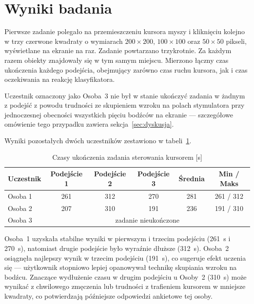 \section{Wyniki badania}
Pierwsze zadanie polegało na przemieszczeniu kursora myszy i kliknięciu
kolejno w trzy czerwone kwadraty o wymiarach $200\times200$, $100\times100$
oraz $50\times50$ pikseli, wyświetlane na ekranie na raz. 
Zadanie powtarzano trzykrotnie. Za każdym razem obiekty znajdowały się w tym samym miejscu. Mierzono łączny czas ukończenia każdego podejścia, obejmujący zarówno czas ruchu kursora,
jak i czas oczekiwania na reakcję klasyfikatora.

Uczestnik oznaczony jako Osoba~3 nie był w stanie ukończyć zadania
w żadnym z podejść z powodu trudności ze skupieniem wzroku
na polach stymulatora przy jednoczesnej obecności wszystkich pięciu bodźców
na ekranie --- szczegółowe omówienie tego przypadku zawiera
sekcja~\ref{sec:dyskusja}.

Wyniki pozostałych dwóch uczestników zestawiono w tabeli~\ref{tab:task1}.

\begin{table}[!ht]
\centering
\caption{Czasy ukończenia zadania sterowania kursorem [s]}
\label{tab:task1}
\begin{tabular}{lccccc}
    \toprule
    \textbf{Uczestnik} & \textbf{Podejście 1} & \textbf{Podejście 2}
        & \textbf{Podejście 3} & \textbf{Średnia} & \textbf{Min / Maks} \\
    \midrule
    Osoba 1 & 261 & 312 & 270 & 281 & 261 / 312 \\
    Osoba 2 & 207 & 310 & 191 & 236 & 191 / 310 \\
    Osoba 3 & \multicolumn{5}{c}{zadanie nieukończone} \\
    \bottomrule
\end{tabular}
\end{table}

Osoba~1 uzyskała stabilne wyniki w pierwszym i trzecim podejściu
(261~s i 270~s), natomiast drugie podejście było wyraźnie dłuższe
(312~s). Osoba~2 osiągnęła najlepszy wynik w trzecim podejściu (191~s),
co sugeruje efekt uczenia się --- użytkownik stopniowo lepiej opanowywał
technikę skupiania wzroku na bodźcu. Znaczące wydłużenie czasu
w drugim podejściu u Osoby~2 (310~s) może wynikać z chwilowego
zmęczenia lub trudności z trafieniem kursorem w mniejsze kwadraty,
co potwierdzają późniejsze odpowiedzi ankietowe tej osoby.

